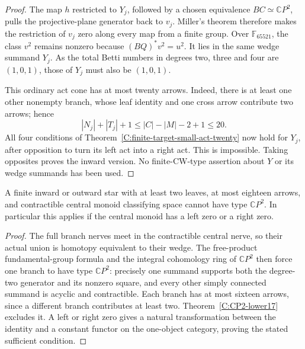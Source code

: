 \begin{proof}
The map $h$ restricted to $Y_j$, followed by a chosen equivalence
$BC\simeq\mathbb CP^2$, pulls the projective-plane generator
back to $v_j$. Miller's theorem therefore makes the restriction
of $v_j$ zero along every map from a finite group. Over
$\mathbb F_{65521}$, the class $v^2$ remains nonzero because
$(BQ)^*v^2=u^2$. It lies in the same wedge summand $Y_j$.
As the total Betti numbers in degrees two, three and four
are $(1,0,1)$, those of $Y_j$ must also be $(1,0,1)$.

This ordinary act cone has at most twenty arrows. Indeed,
there is at least one other nonempty branch, whose leaf
identity and one cross arrow contribute two arrows; hence
\[
 |N_j|+|T_j|+1
 \leq |C|-|M|-2+1\leq20.
\]
All four conditions of
Theorem~\ref{C:finite-target-small-act-twenty} now hold for
$Y_j$, after opposition to turn its left act into a right act.
This is impossible. Taking opposites proves the inward version.
No finite-CW-type assertion about $Y$ or its wedge summands
has been used.
\end{proof}

\begin{corollary}\label{C:star-contractible-center18}
A finite inward or outward star with at least two leaves,
at most eighteen arrows, and contractible central monoid
classifying space cannot have type $\mathbb CP^2$.
In particular this applies if the central monoid has a
left zero or a right zero.
\end{corollary}
\begin{proof}
The full branch nerves meet in the contractible central
nerve, so their actual union is homotopy equivalent to
their wedge. The free-product fundamental-group formula
and the integral cohomology ring of $\mathbb CP^2$ then
force one branch to have type $\mathbb CP^2$: precisely one
summand supports both the degree-two generator and its
nonzero square, and every other simply connected summand
is acyclic and contractible. Each branch has at most
sixteen arrows, since a different branch contributes at
least two. Theorem~\ref{C:CP2-lower17} excludes it.
A left or right zero gives a natural transformation
between the identity and a constant functor on the
one-object category, proving the stated sufficient condition.
\end{proof}

